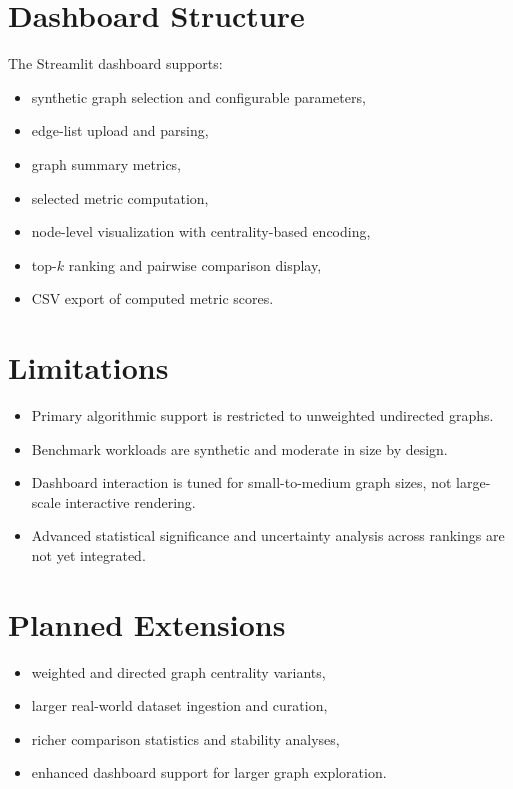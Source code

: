 \documentclass[11pt]{article}
\begin{document}
\section{Dashboard Structure}
The Streamlit dashboard supports:
\begin{itemize}[leftmargin=*]
    \item synthetic graph selection and configurable parameters,
    \item edge-list upload and parsing,
    \item graph summary metrics,
    \item selected metric computation,
    \item node-level visualization with centrality-based encoding,
    \item top-$k$ ranking and pairwise comparison display,
    \item CSV export of computed metric scores.
\end{itemize}

\section{Limitations}
\begin{itemize}[leftmargin=*]
    \item Primary algorithmic support is restricted to unweighted undirected graphs.
    \item Benchmark workloads are synthetic and moderate in size by design.
    \item Dashboard interaction is tuned for small-to-medium graph sizes, not large-scale interactive rendering.
    \item Advanced statistical significance and uncertainty analysis across rankings are not yet integrated.
\end{itemize}

\section{Planned Extensions}
\begin{itemize}[leftmargin=*]
    \item weighted and directed graph centrality variants,
    \item larger real-world dataset ingestion and curation,
    \item richer comparison statistics and stability analyses,
    \item enhanced dashboard support for larger graph exploration.
\end{itemize}
\end{document}
